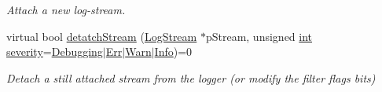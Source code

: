 \begin{DoxyCompactItemize}
\begin{DoxyCompactList}\small\item\em Attach a new log-\/stream. \end{DoxyCompactList}\item 
virtual bool \hyperlink{class_assimp_1_1_logger_a9489263727f29fecbd705d5c8d2590c0}{detatch\-Stream} (\hyperlink{class_assimp_1_1_log_stream}{Log\-Stream} $\ast$p\-Stream, unsigned \hyperlink{_s_d_l__thread_8h_a6a64f9be4433e4de6e2f2f548cf3c08e}{int} \hyperlink{_g_l_e_w_2glew_8h_aa9ef9fc6186ec914a859436da4764bca}{severity}=\hyperlink{class_assimp_1_1_logger_acd0b52a87d6fc11e957ed2c6e2ad75b6a0cb475014d27098c3423738c571d857f}{Debugging}$|$\hyperlink{class_assimp_1_1_logger_acd0b52a87d6fc11e957ed2c6e2ad75b6a71054d0b1323abcea46d050d69013d27}{Err}$|$\hyperlink{class_assimp_1_1_logger_acd0b52a87d6fc11e957ed2c6e2ad75b6a1279c77aaee5a3d7df835a9b9305a697}{Warn}$|$\hyperlink{class_assimp_1_1_logger_acd0b52a87d6fc11e957ed2c6e2ad75b6aa3377a574928b86f7de55c5df154f461}{Info})=0
\begin{DoxyCompactList}\small\item\em Detach a still attached stream from the logger (or modify the filter flags bits) \end{DoxyCompactList}\end{DoxyCompactItemize}
